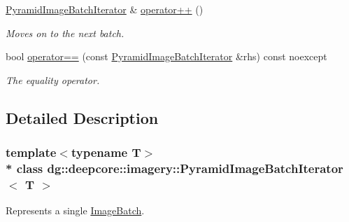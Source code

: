 \begin{DoxyCompactItemize}
\hyperlink{classdg_1_1deepcore_1_1imagery_1_1_pyramid_image_batch_iterator}{Pyramid\+Image\+Batch\+Iterator} \& \hyperlink{group___imagery_module_ga8a830889046c718cbfcb4067a33908f3}{operator++} ()
\begin{DoxyCompactList}\small\item\em Moves on to the next batch. \end{DoxyCompactList}\item 
bool \hyperlink{group___imagery_module_ga6ebbb4ad321f8a6fff0423155a784e3c}{operator==} (const \hyperlink{classdg_1_1deepcore_1_1imagery_1_1_pyramid_image_batch_iterator}{Pyramid\+Image\+Batch\+Iterator} \&rhs) const noexcept
\begin{DoxyCompactList}\small\item\em The equality operator. \end{DoxyCompactList}\end{DoxyCompactItemize}


\subsection{Detailed Description}
\subsubsection*{template$<$typename T$>$\\*
class dg\+::deepcore\+::imagery\+::\+Pyramid\+Image\+Batch\+Iterator$<$ T $>$}

Represents a single \hyperlink{classdg_1_1deepcore_1_1imagery_1_1_image_batch}{Image\+Batch}. 